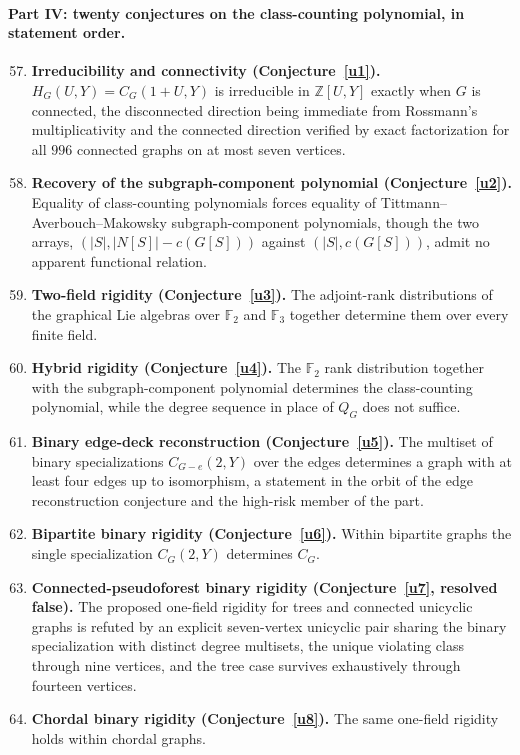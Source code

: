 \documentclass[11pt]{article}
\theoremstyle{definition}
\newcommand{\Fq}{\mathbb F}
\newcommand{\Z}{\mathbb Z}
\providecommand{\Z}{\mathbb Z}
\begin{document}
\paragraph{Part IV: twenty conjectures on the class-counting polynomial, in statement order.}
\begin{enumerate}\setcounter{enumi}{56}
\item \textbf{Irreducibility and connectivity (Conjecture~\ref{u1}).}  $H_G(U,Y)=C_G(1+U,Y)$ is irreducible in $\Z[U,Y]$ exactly when $G$ is connected, the disconnected direction being immediate from Rossmann's multiplicativity and the connected direction verified by exact factorization for all $996$ connected graphs on at most seven vertices.
\item \textbf{Recovery of the subgraph-component polynomial (Conjecture~\ref{u2}).}  Equality of class-counting polynomials forces equality of Tittmann--Averbouch--Makowsky subgraph-component polynomials, though the two arrays, $(|S|,|N[S]|-c(G[S]))$ against $(|S|,c(G[S]))$, admit no apparent functional relation.
\item \textbf{Two-field rigidity (Conjecture~\ref{u3}).}  The adjoint-rank distributions of the graphical Lie algebras over $\Fq_2$ and $\Fq_3$ together determine them over every finite field.
\item \textbf{Hybrid rigidity (Conjecture~\ref{u4}).}  The $\Fq_2$ rank distribution together with the subgraph-component polynomial determines the class-counting polynomial, while the degree sequence in place of $Q_G$ does not suffice.
\item \textbf{Binary edge-deck reconstruction (Conjecture~\ref{u5}).}  The multiset of binary specializations $C_{G-e}(2,Y)$ over the edges determines a graph with at least four edges up to isomorphism, a statement in the orbit of the edge reconstruction conjecture and the high-risk member of the part.
\item \textbf{Bipartite binary rigidity (Conjecture~\ref{u6}).}  Within bipartite graphs the single specialization $C_G(2,Y)$ determines $C_G$.
\item \textbf{Connected-pseudoforest binary rigidity (Conjecture~\ref{u7}, resolved false).}  The proposed one-field rigidity for trees and connected unicyclic graphs is refuted by an explicit seven-vertex unicyclic pair sharing the binary specialization with distinct degree multisets, the unique violating class through nine vertices, and the tree case survives exhaustively through fourteen vertices.
\item \textbf{Chordal binary rigidity (Conjecture~\ref{u8}).}  The same one-field rigidity holds within chordal graphs.

\end{enumerate}
\end{document}
